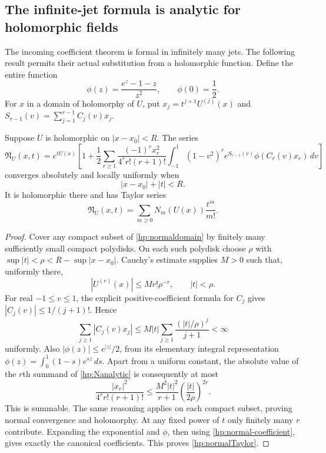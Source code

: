 \subsection{The infinite-jet formula is analytic for holomorphic fields}

The incoming coefficient theorem is formal in infinitely many jets.
The following result permits their actual substitution from a
holomorphic function. Define the entire function
\[
 \phi(z)=\frac{e^z-1-z}{z^2},\qquad \phi(0)=\frac12.
\]
For $x$ in a domain of holomorphy of $U$, put
$x_j=t^{j+1}U^{(j)}(x)$ and
$S_{r-1}(v)=\sum_{j=1}^{r-1}C_j(v)x_j$.

\begin{theorem}\label{hp:analyticN}
Suppose $U$ is holomorphic on $|x-x_0|<R$. The series
\begin{equation}\label{hp:Nanalytic}
 \boxed{\displaystyle
 \mathfrak N_U(x,t)=e^{tU(x)}\left[
 1+\frac12\sum_{r\ge1}
 \frac{(-1)^r x_r^2}{4^r r!(r+1)!}
 \int_{-1}^1(1-v^2)^r e^{S_{r-1}(v)}
                         \phi(C_r(v)x_r)\,dv\right]}
\end{equation}
converges absolutely and locally uniformly when
\begin{equation}\label{hp:normaldomain}
                        |x-x_0|+|t|<R.
\end{equation}
It is holomorphic there and has Taylor series
\begin{equation}\label{hp:normalTaylor}
            \mathfrak N_U(x,t)=\sum_{m\ge0}N_m(U(x))\frac{t^m}{m!}.
\end{equation}
\end{theorem}

\begin{proof}
Cover any compact subset of \eqref{hp:normaldomain} by finitely
many sufficiently small compact polydisks. On each such polydisk
choose $\rho$ with $\sup|t|<\rho<R-\sup|x-x_0|$. Cauchy's
estimate supplies $M>0$ such that, uniformly there,
\[
 |U^{(r)}(x)|\le Mr!\rho^{-r},\qquad |t|<\rho.
\]
For real $-1\le v\le1$, the explicit positive-coefficient formula
for $C_j$ gives $|C_j(v)|\le1/(j+1)!$. Hence
\[
 \sum_{j\ge1}|C_j(v)x_j|
 \le M|t|\sum_{j\ge1}\frac{(|t|/\rho)^j}{j+1}<\infty
\]
uniformly. Also $|\phi(z)|\le e^{|z|}/2$, from its elementary
integral representation
$\phi(z)=\int_0^1(1-s)e^{sz}\,ds$.
Apart from a uniform constant, the absolute value of the $r$th
summand of \eqref{hp:Nanalytic} is consequently at most
\[
 \frac{|x_r|^2}{4^r r!(r+1)!}
 \le\frac{M^2|t|^2}{r+1}
                  \left(\frac{|t|}{2\rho}\right)^{2r}.
\]
This is summable. The same reasoning applies on each compact
subset, proving normal convergence and holomorphy. At any fixed
power of $t$ only finitely many $r$ contribute. Expanding the
exponential and $\phi$, then using
\eqref{hp:normal-coefficient}, gives exactly the canonical
coefficients. This proves \eqref{hp:normalTaylor}.
\end{proof}

